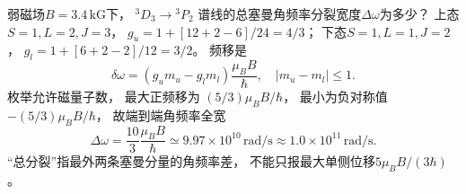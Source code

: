 弱磁场$B=3.4\,\mathrm{kG}$下，
\({}^{3}D_3\to{}^{3}P_2\)
谱线的总塞曼角频率分裂宽度$\Delta\omega$为多少？
\exsolution
上态$S=1,L=2,J=3$，
$g_u=1+[12+2-6]/24=4/3$；
下态$S=1,L=1,J=2$，
$g_l=1+[6+2-2]/12=3/2$。
频移是
\[
 \delta\omega=(g_um_u-g_lm_l)\frac{\mu_BB}{\hbar},
 \quad |m_u-m_l|\le1.
\]
枚举允许磁量子数，
最大正频移为
$(5/3)\mu_BB/\hbar$，
最小为负对称值
$-(5/3)\mu_BB/\hbar$，
故端到端角频率全宽
\[
 \boxed{\Delta\omega=
 \frac{10}{3}\frac{\mu_BB}{\hbar}
 \simeq9.97\times10^{10}\,\mathrm{rad/s}
 \approx1.0\times10^{11}\,\mathrm{rad/s}}.
\]
\excheck “总分裂”指最外两条塞曼分量的角频率差，
不能只报最大单侧位移$5\mu_BB/(3\hbar)$。
